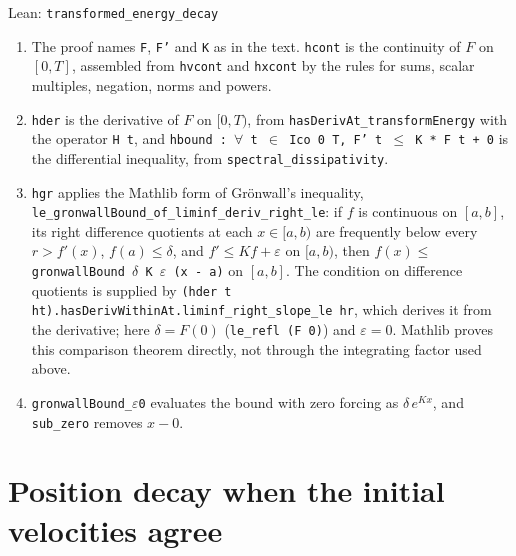 \documentclass[11pt,a4paper]{article}
\begin{document}
\begin{leanbox}{Lean: \texttt{transformed\_\allowbreak{}energy\_\allowbreak{}decay}}
\begin{enumerate}


\item The proof names \texttt{F}, \texttt{F'} and \texttt{K} as in the text. \texttt{hcont} is the continuity of \(F\) on \([0,T]\), assembled from \texttt{hvcont} and \texttt{hxcont} by the rules for sums, scalar multiples, negation, norms and powers.

\item \texttt{hder} is the derivative of \(F\) on \([0,T)\), from \texttt{has\allowbreak{}Deriv\allowbreak{}At\_\allowbreak{}transform\allowbreak{}Energy} with the operator \texttt{H t}, and \texttt{hbound : \ensuremath{\forall} t \ensuremath{\in} Ico 0 T, F' t \ensuremath{\le} K * F t + 0} is the differential inequality, from \texttt{spectral\_\allowbreak{}dissipativity}.

\item \texttt{hgr} applies the Mathlib form of Grönwall's inequality, \texttt{le\_\allowbreak{}gronwall\allowbreak{}Bound\_\allowbreak{}of\_\allowbreak{}liminf\_\allowbreak{}deriv\_\allowbreak{}right\_\allowbreak{}le}: if \(f\) is continuous on \([a,b]\), its right difference quotients at each \(x\in[a,b)\) are frequently below every \(r>f'(x)\), \(f(a)\le\delta\), and \(f'\le Kf+\varepsilon\) on \([a,b)\), then \(f(x)\le\) \texttt{gronwall\allowbreak{}Bound \ensuremath{\delta} K \ensuremath{\varepsilon} (x -\allowbreak{} a)} on \([a,b]\). The condition on difference quotients is supplied by \texttt{(hder t ht).\allowbreak{}has\allowbreak{}Deriv\allowbreak{}Within\allowbreak{}At.\allowbreak{}liminf\_\allowbreak{}right\_\allowbreak{}slope\_\allowbreak{}le hr}, which derives it from the derivative; here \(\delta=F(0)\) (\texttt{le\_\allowbreak{}refl (F 0)}) and \(\varepsilon=0\). Mathlib proves this comparison theorem directly, not through the integrating factor used above.

\item \texttt{gronwall\allowbreak{}Bound\_\allowbreak{}\ensuremath{\varepsilon}0} evaluates the bound with zero forcing as \(\delta\,e^{Kx}\), and \texttt{sub\_\allowbreak{}zero} removes \(x-0\).

\end{enumerate}
\end{leanbox}

\section{\texorpdfstring{Position decay when the initial velocities agree}{Position decay when the initial velocities agree}}
\end{document}
